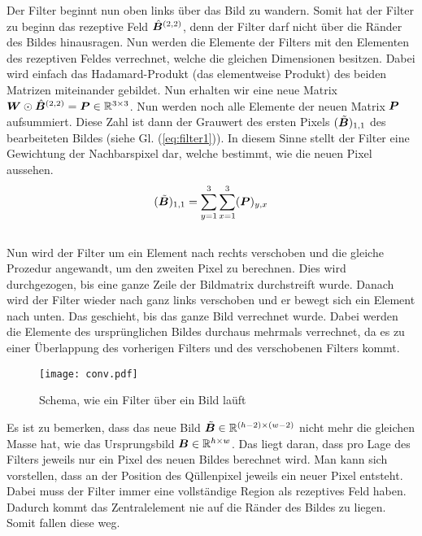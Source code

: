 \para{}
Der Filter beginnt nun oben links über das Bild zu wandern. Somit
hat der Filter zu beginn das rezeptive Feld $\hat{\bm{B}}^{(2,2)}$, denn der
Filter darf nicht über die Ränder des Bildes hinausragen.
Nun werden die Elemente der Filters mit den Elementen des rezeptiven Feldes
verrechnet, welche die gleichen Dimensionen besitzen. Dabei wird einfach das
Hadamard-Produkt (das elementweise Produkt) des beiden Matrizen miteinander
gebildet. Nun erhalten wir eine neue Matrix $\bm{W} \odot
\hat{\bm{B}}^{(2,2)} = \bm{P} \in \mathbb{R}^{3 \times 3}$.
Nun werden noch alle Elemente der neuen Matrix $\bm{P}$
aufsummiert. Diese Zahl ist dann der Grauwert des ersten Pixels $(\tilde{\bm{B}})_{1,1}$ des bearbeiteten
Bildes (siehe Gl. (\ref{eq:filter1})). In diesem Sinne stellt der Filter eine Gewichtung der Nachbarspixel dar, welche
bestimmt, wie die neuen Pixel aussehen.
\\
\begin{equation}\label{eq:filter1}
  (\tilde{\bm{B}})_{1,1} = \sum_{y=1}^3 \sum_{x=1}^3 (\bm{P})_{y,x}
\end{equation}
\\
Nun wird der Filter um ein Element nach rechts verschoben und die gleiche
Prozedur angewandt, um den zweiten Pixel zu berechnen. Dies
wird durchgezogen, bis eine ganze Zeile der Bildmatrix durchstreift wurde.
Danach wird der Filter wieder nach ganz links verschoben und er bewegt sich ein
Element nach unten. Das geschieht, bis das ganze Bild verrechnet wurde.
Dabei werden die Elemente des ursprünglichen Bildes durchaus mehrmals
verrechnet, da es zu einer Überlappung des vorherigen Filters und des
verschobenen Filters kommt.
\para{}

\ifcp
\begin{figure}[h!]
  \centering
  \texttt{[image: conv.pdf]}
  \caption{Schema, wie ein Filter über ein Bild laüft}
\end{figure}
\fi

Es ist zu bemerken, dass das neue Bild $\tilde{\bm{B}} \in \mathbb{R}^{(h-2) \times (w-2)}$ nicht mehr die gleichen Masse
hat, wie das Ursprungsbild $\bm{B} \in \mathbb{R}^{h \times w}$. Das liegt daran, dass pro
Lage des Filters jeweils nur ein Pixel des neuen Bildes berechnet wird. Man kann
sich vorstellen, dass an der Position des Qüllenpixel jeweils ein neuer
Pixel entsteht. Dabei muss der Filter immer eine vollständige Region als
rezeptives Feld haben. Dadurch kommt das Zentralelement nie auf die Ränder des
Bildes zu liegen. Somit fallen diese weg.
\para{}
\cite{deeplearning.ai:cnn}
\cite{wiki:convolution}

